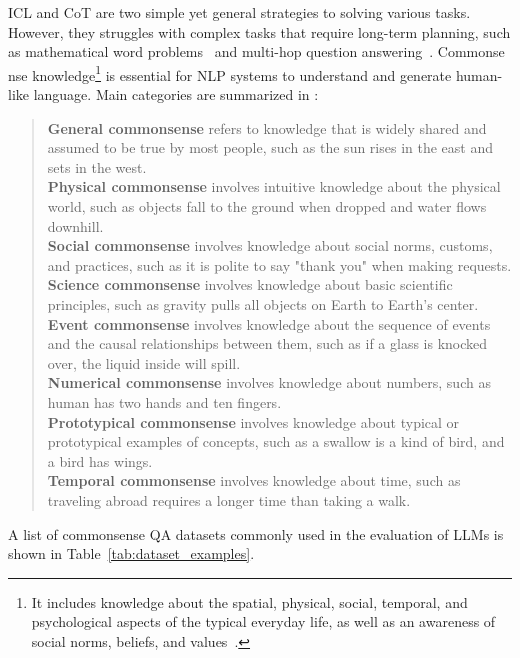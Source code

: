 ICL and CoT are two simple yet general strategies to solving various tasks.
However, they struggles with complex tasks that require long-term planning, such as mathematical word problems~\cite{qian2022limitations} and multi-hop question answering~\cite{bian2024chatgpt}.
Commonse	nse knowledge\footnote{It includes knowledge about the spatial,
	physical, social, temporal, and psychological aspects of the typical everyday life, as well as an awareness of social norms, beliefs, and values~\cite{liu2004conceptnet}.} is essential for NLP systems to understand and generate human-like language.
Main categories are summarized in \textcite{bian2024chatgpt}:
\begin{quote}
	\textbf{General commonsense} refers to knowledge that is widely shared and assumed to be true by most people, such as the sun rises in the east and sets in the west.\\
	\textbf{Physical commonsense} involves intuitive knowledge about the physical world, such as objects fall to the ground when dropped and water flows downhill.\\
	\textbf{Social commonsense} involves knowledge about social norms, customs, and practices, such as it is polite to say "thank you" when
	making requests.\\
	\textbf{Science commonsense} involves knowledge about basic scientific principles, such as gravity pulls all objects on Earth to Earth’s center.\\
	\textbf{Event commonsense} involves knowledge about the sequence of events and the causal relationships between them, such as if a glass is knocked over, the liquid inside will spill.\\
	\textbf{Numerical commonsense} involves knowledge about numbers, such as human has two hands and ten fingers.\\
	\textbf{Prototypical commonsense} involves knowledge about typical or prototypical examples of concepts, such as a swallow is a kind of bird, and a bird has wings.\\
	\textbf{Temporal commonsense} involves knowledge about time, such as traveling abroad requires a longer time than taking a walk.
\end{quote}
A list of commonsense QA datasets commonly used in the evaluation of LLMs is shown in Table~\ref{tab:dataset_examples}.
